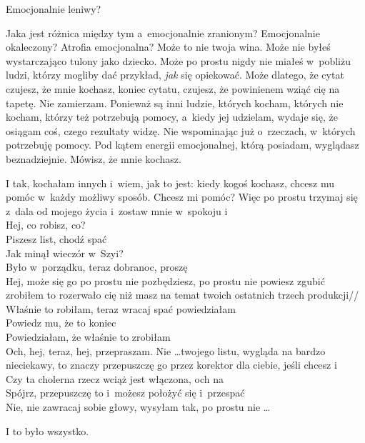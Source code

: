 \documentclass[oneside,polish,11pt,rmheadings]{mwbk}
\begin{document}
Emocjonalnie leniwy? 

Jaka jest różnica między tym a~emocjonalnie zranionym? Emocjonalnie okaleczony? Atrofia emocjonalna? Może to nie twoja wina. Może nie byłeś wystarczająco tulony jako dziecko. Może po prostu nigdy nie miałeś w~pobliżu ludzi, którzy mogliby dać przykład,  \textit{jak }się opiekować. Może dlatego, że cytat czujesz, że mnie kochasz, koniec cytatu, czujesz, że powinienem wziąć cię na tapetę. Nie zamierzam. Ponieważ są inni ludzie, których kocham, których nie kocham, którzy też potrzebują pomocy, a~kiedy jej udzielam, wydaje się, że osiągam coś, czego rezultaty widzę. Nie wspominając już o~rzeczach, w~których potrzebuję pomocy. Pod kątem energii emocjonalnej, którą posiadam, wyglądasz beznadziejnie. Mówisz, że mnie kochasz. 

I tak, kochałam innych i~wiem, jak to jest: kiedy kogoś kochasz, chcesz mu pomóc w~każdy możliwy sposób. Chcesz mi pomóc? Więc po prostu trzymaj się z~dala od mojego życia i~zostaw mnie w~spokoju i \\ Hej, co robisz, co? \\ Piszesz list, chodź spać \\ Jak minął wieczór w~Szyi? \\ Było w~porządku, teraz dobranoc, proszę \\ Hej, może się go po prostu nie pozbędziesz, po prostu nie powiesz zgubić zrobiłem to rozerwało cię niż masz na temat twoich ostatnich trzech produkcji// Właśnie to robiłam, teraz wracaj spać powiedziałam \\ Powiedz mu, że to koniec \\Powiedziałam, że właśnie to zrobiłam \\ Och, hej, teraz, hej, przepraszam. Nie  \ldots  twojego listu, wygląda na bardzo nieciekawy, to znaczy przepuszczę go przez korektor dla ciebie, jeśli chcesz i~ \\ Czy ta cholerna rzecz wciąż jest włączona, och na \\ Spójrz, przepuszczę to i~możesz położyć się i~przespać  \\Nie, nie zawracaj sobie głowy, wysyłam tak, po prostu nie  \ldots  

I to było wszystko. 
\end{document}
